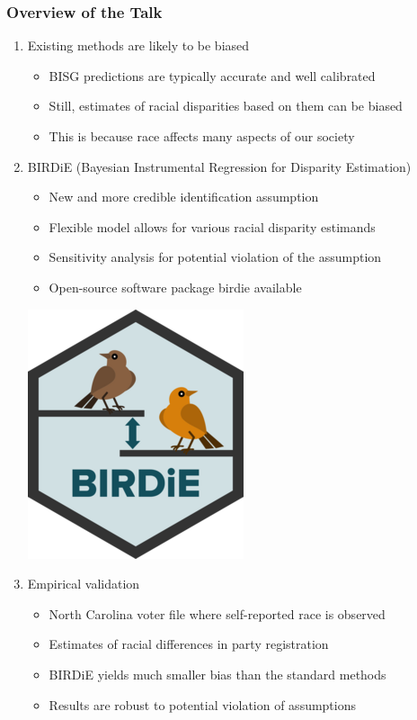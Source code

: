 \documentclass[handout]{beamer}
\begin{document}
\begin{frame}

  \frametitle{Overview of the Talk}

  \begin{enumerate}
  \item Existing methods are likely to be biased
    \begin{itemize}
    \item BISG predictions are typically accurate and well calibrated
    \item Still, estimates of racial disparities based on them can be biased
    \item This is because race affects many aspects of our society
    \end{itemize}
    \bigskip
  \item \alert{BIRDiE} (Bayesian Instrumental Regression for Disparity
    Estimation) 
    \begin{itemize}
    \item New and more credible identification assumption
    \item Flexible model allows for various racial disparity estimands
    \item Sensitivity analysis for potential violation of the
      assumption
    \item Open-source software package \alert{birdie} available
    \end{itemize}
    \begin{flushright}
      \vspace{-.5in}
      \includegraphics[scale=0.165]{../man/figures/logo.png}
     \end{flushright}
  \item Empirical validation
    \begin{itemize}
    \item North Carolina voter file where self-reported race is
      observed
    \item Estimates of racial differences in party registration
    \item BIRDiE yields much smaller bias than the standard methods
    \item Results are robust to potential violation of assumptions
    \end{itemize}
  \end{enumerate}

\end{frame}
\end{document}

